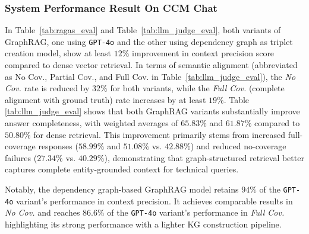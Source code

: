 \documentclass[runningheads]{llncs}
\begin{document}
\subsubsection{System Performance Result On CCM Chat}
In Table~\ref{tab:ragas_eval} and Table~\ref{tab:llm_judge_eval}, both variants of GraphRAG, one using \texttt{GPT-4o} and the other using dependency graph as triplet creation model, show at least $12\%$ improvement in context precision score compared to dense vector retrieval. In terms of semantic alignment (abbreviated as No Cov., Partial Cov., and Full Cov. in Table~\ref{tab:llm_judge_eval}), the \textit{No Cov.} rate is reduced by $32\%$ for both variants, while the \textit{Full Cov.} (complete alignment with ground truth) rate increases by at least $19\%$. Table \ref{tab:llm_judge_eval} shows that both GraphRAG variants substantially improve answer completeness, with weighted averages of $65.83\%$ and $61.87\%$ compared to $50.80\%$ for dense retrieval. This improvement primarily stems from increased full-coverage responses ($58.99\%$ and $51.08\%$ vs. $42.88\%$) and reduced no-coverage failures ($27.34\%$ vs. $40.29\%$), demonstrating that graph-structured retrieval better captures complete entity-grounded context for technical queries.

Notably, the dependency graph-based GraphRAG model retains $94\%$ of the \texttt{GPT-4o} variant’s performance in context precision. It achieves comparable results in \textit{No Cov.} and reaches $86.6\%$ of the \texttt{GPT-4o} variant’s performance in \textit{Full Cov.} highlighting its strong performance with a lighter KG construction pipeline.

\begingroup
\setlength{\intextsep}{6pt}      %
\setlength{\textfloatsep}{6pt}   %
\setlength{\floatsep}{6pt}       %
\setlength{\abovecaptionskip}{2pt}
\setlength{\belowcaptionskip}{2pt}

\FloatBarrier  %
\end{document}
